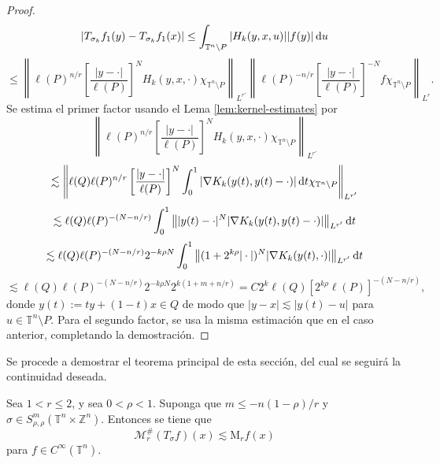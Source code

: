 \begin{proof}
\begin{equation*}
	|T_{\sigma_k}f_1(y) - T_{\sigma_k}f_1(x)| \leq \int_{\mathbb{T}^n\setminus P} |H_k(y, x, u)||f(y)|\mathop{}\!\mathrm{d} u
\end{equation*}
\begin{equation*}
	\leq \left\| \ell(P)^{n/r} \left[ \frac{|y-\cdot|}{\ell(P)}
	\right]^N H_k(y, x, \cdot) \chi_{\mathbb{T}^n\setminus P}
	\right\|_{L^{r'}} \left\| \ell(P)^{-n/r} \left[ \frac{|y-\cdot|}{\ell(P)}
	\right]^{-N} f\chi_{\mathbb{T}^n\setminus P}
	\right\|_{L^r}.
\end{equation*}
Se estima el primer factor usando el Lema \ref{lem:kernel-estimates} por
\begin{equation*}
	\left\| \ell(P)^{n/r} \left[ \frac{|y-\cdot|}{\ell(P)}
	\right]^N H_k(y, x, \cdot) \chi_{\mathbb{T}^n\setminus P}
	\right\|_{L^{r'}}
\end{equation*}
\begin{equation*}
	\lesssim \left\| \ell(Q)\ell(P)^{n/r} \left[ \frac{|y-\cdot|}{\ell(P)}
	\right]^N \int_0^1|\nabla K_k(y(t), y(t) - \cdot)|\mathop{}\!\mathrm{d} t \chi_{\mathbb{T}^n\setminus P}
	\right\|_{L^{r'}}
\end{equation*}
\begin{equation*}
	\lesssim \ell(Q)\ell(P)^{-(N-n/r)} \int_0^1\left\| |y(t) - \cdot|^N |\nabla K_k(y(t), y(t) - \cdot)|
	\right\|_{L^{r'}} \mathop{}\!\mathrm{d} t
\end{equation*}
\begin{equation*}
	\lesssim \ell(Q)\ell(P)^{-(N-n/r)} 2^{-k\rho N} \int_0^1 \left\| (1+2^{k\rho}|\cdot|)^N |\nabla K_k(y(t), \cdot)| 
	\right\|_{L^{r'}} \mathop{}\!\mathrm{d} t
\end{equation*}
\begin{equation*}
	\lesssim \ell(Q)\ell(P)^{-(N-n/r)} 2^{-k\rho N} 2^{k(1+m+n/r)} = C 2^k \ell(Q)[2^{k\rho}\ell(P)]^{-(N-n/r)},
\end{equation*}
donde $y(t) := ty + (1-t)x \in Q$ de modo que $|y-x|\lesssim|y(t)-u|$ para $u \in \mathbb{T}^n\setminus P$. Para el segundo factor, se usa la misma estimación que en el caso anterior, completando la demostración.
\end{proof}
Se procede a demostrar el teorema principal de esta sección, del cual se seguirá la continuidad deseada.
\begin{theorem}
Sea $1<r\leq 2$, y sea $0<\rho<1$. Suponga que $m\leq-n(1-\rho)/r$ y $\sigma \in S^m_{\rho,\rho}(\mathbb{T}^n \times \mathbb{Z}^n)  $. Entonces se tiene que 
\begin{equation*}
	\mathcal{M}^\#_r(T_\sigma f)(x) \lesssim\mathrm{M}_r f(x)
\end{equation*}
para $f \in C^\infty(\mathbb{T}^n)$.
\label{theo:sharp-maximal}
\end{theorem}
